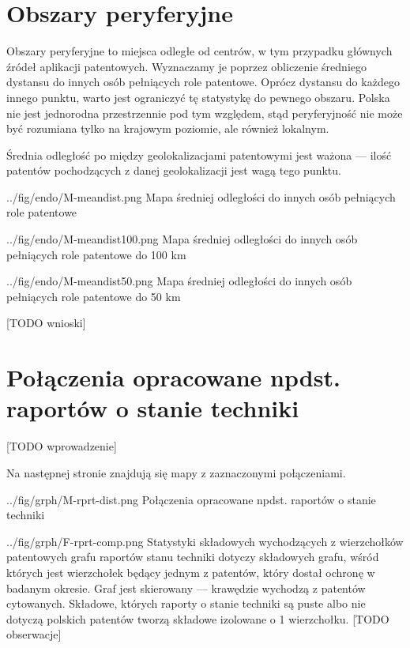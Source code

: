     \newpage\section
  {Obszary peryferyjne}

Obszary peryferyjne to miejsca odległe od centrów, w tym przypadku
głównych źródeł aplikacji patentowych. Wyznaczamy je poprzez obliczenie
średniego dystansu do innych osób pełniących role patentowe.
Oprócz dystansu do każdego innego punktu, warto jest ograniczyć
tę statystykę do pewnego obszaru. Polska nie jest jednorodna przestrzennie 
pod tym względem, stąd peryferyjność nie może być rozumiana tylko 
na krajowym poziomie, ale również lokalnym.

\begin{uwaga}
Średnia odległość po między geolokalizacjami patentowymi jest ważona ---
ilość patentów pochodzących z danej geolokalizacji jest wagą tego punktu.
\end{uwaga}

  \fig
{../fig/endo/M-meandist.png}
{ Mapa średniej odległości do innych osób pełniących role patentowe }

  \fig
{../fig/endo/M-meandist100.png}
{ Mapa średniej odległości do innych osób pełniących role patentowe do 100 km }

  \fig
{../fig/endo/M-meandist50.png}
{ Mapa średniej odległości do innych osób pełniących role patentowe do 50 km }


[TODO wnioski]




    \newpage\section
  {Połączenia opracowane npdst. raportów o stanie techniki}

[TODO wprowadzenie]

Na następnej stronie znajdują się mapy z zaznaczonymi połączeniami.

\newpage

  \chart
{../fig/grph/M-rprt-dist.png}
{ Połączenia opracowane npdst. raportów o stanie techniki }\newpage

  \chartside
{../fig/grph/F-rprt-comp.png}
{ Statystyki składowych wychodzących z wierzchołków patentowych
  grafu raportów stanu techniki }{
 dotyczy składowych grafu, wśród których
jest wierzchołek będący jednym z patentów, który dostał ochronę w badanym okresie.
Graf jest skierowany --- krawędzie wychodzą z patentów cytowanych.
Składowe, których raporty o stanie techniki są puste albo nie dotyczą 
polskich patentów tworzą składowe izolowane o 1 wierzchołku.
[TODO obserwacje]
}




